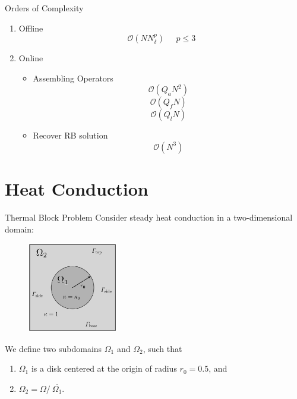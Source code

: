 \documentclass[9pt]{beamer}
\begin{document}
\begin{frame}{Orders of Complexity}
\begin{enumerate}
    \item Offline
    $$\mathcal{O}(NN_{\delta}^p) \mspace{25mu} p \leq 3$$
    
    \item Online
    \begin{itemize}
        \item Assembling Operators
        $$\mathcal{O}(Q_a N^2)$$
        $$\mathcal{O}(Q_f N)$$
        $$\mathcal{O}(Q_l N)$$
        
        \item Recover RB solution
        $$\mathcal{O}(N^3)$$
    \end{itemize}
\end{enumerate}
\end{frame}



\section[Thermal Block]{Heat Conduction} 
\begin{frame}{Thermal Block Problem}
    Consider steady heat conduction in a two-dimensional domain:
    \begin{figure}
        \centering
        \includegraphics[width=0.35\textwidth]{thermal_block.png}
    \end{figure}
    We define two subdomains $\Omega_1$ and $\Omega_2$, such that
 \begin{enumerate}
 \item $\Omega_1$ is a disk centered at the origin of radius $r_0=0.5$, and
 \item $\Omega_2=\Omega/\ \overline{\Omega_1}$.
 \end{enumerate}
\end{frame}
\end{document}
